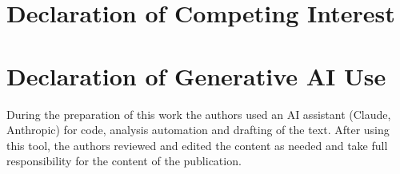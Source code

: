 \section*{Declaration of Competing Interest}

\section*{Declaration of Generative AI Use}
During the preparation of this work the authors used an AI assistant (Claude, Anthropic) for code, analysis automation and drafting of the
text. After using this tool, the authors reviewed and edited the content as needed and take full responsibility for the content of the
publication. 
